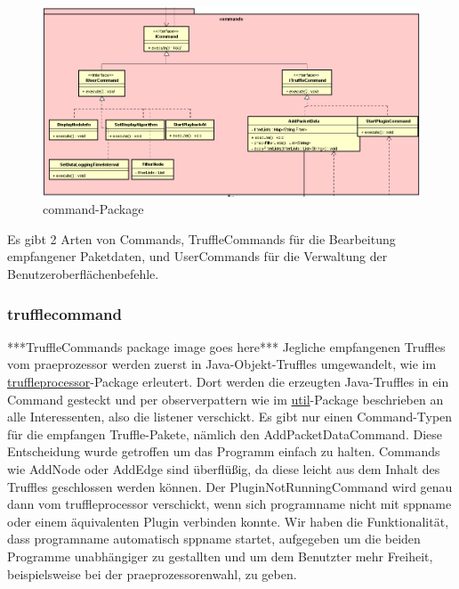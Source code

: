 \begin{figure}[H]
  \centering
  \includegraphics[width=\textwidth]{../diagramimages/commands.png}
  \caption{command-Package}
\end{figure}

Es gibt 2 Arten von Commands, TruffleCommands für die Bearbeitung empfangener
Paketdaten, und UserCommands für die Verwaltung der Benutzeroberflächenbefehle.

      \subsubsection{trufflecommand}
      \label{subsubsec:trufflecommand}
      ***TruffleCommands package image goes here***
      \newline
      \newline
      Jegliche empfangenen Truffles vom \gls{praeprozessor} werden zuerst in Java-Objekt-Truffles umgewandelt, wie
      im \hyperref[subsubsec:truffleprocessor]{truffleprocessor}-Package erleutert. Dort
      werden die erzeugten Java-Truffles in ein Command gesteckt und per \gls{observerpattern}
      wie im \hyperref[subsec:util]{util}-Package beschrieben an alle Interessenten, also die \gls{listener} verschickt.
      \newline
      \newline
      Es gibt nur einen Command-Typen für die empfangen Truffle-Pakete, nämlich den
      AddPacketDataCommand. Diese Entscheidung wurde getroffen um das Programm einfach
      zu halten. Commands wie AddNode oder AddEdge sind überflüßig, da diese leicht aus
      dem Inhalt des Truffles geschlossen werden können.
      \newline
      \newline
      Der PluginNotRunningCommand wird genau dann vom truffleprocessor verschickt, wenn sich \gls{programname}
      nicht mit \gls{sppname} oder einem äquivalenten Plugin verbinden konnte. Wir
      haben die Funktionalität, dass \gls{programname} automatisch \gls{sppname} startet,
      aufgegeben um die beiden Programme unabhängiger zu gestallten und um dem Benutzter
      mehr Freiheit, beispielsweise bei der \gls{praeprozessor}enwahl, zu geben.


